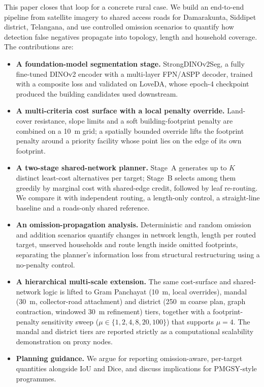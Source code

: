 \documentclass[journal]{IEEEtran}
\begin{document}
This paper closes that loop for a concrete rural case. We build an end-to-end pipeline from satellite imagery to shared access roads for Damarakunta, Siddipet district, Telangana, and use controlled omission scenarios to quantify how detection false negatives propagate into topology, length and household coverage. The contributions are:
\begin{itemize}
\item \textbf{A foundation-model segmentation stage.} StrongDINOv2Seg, a fully fine-tuned DINOv2 encoder with a multi-layer FPN/ASPP decoder, trained with a composite loss and validated on LoveDA, whose epoch-4 checkpoint produced the building candidates used downstream.
\item \textbf{A multi-criteria cost surface with a local penalty override.} Land-cover resistance, slope limits and a soft building-footprint penalty are combined on a 10~m grid; a spatially bounded override lifts the footprint penalty around a priority facility whose point lies on the edge of its own footprint.
\item \textbf{A two-stage shared-network planner.} Stage~A generates up to $K$ distinct least-cost alternatives per target; Stage~B selects among them greedily by marginal cost with shared-edge credit, followed by leaf re-routing. We compare it with independent routing, a length-only control, a straight-line baseline and a roads-only shared reference.
\item \textbf{An omission-propagation analysis.} Deterministic and random omission and addition scenarios quantify changes in network length, length per routed target, unserved households and route length inside omitted footprints, separating the planner's information loss from structural restructuring using a no-penalty control.
\item \textbf{A hierarchical multi-scale extension.} The same cost-surface and shared-network logic is lifted to Gram Panchayat (10~m, local overrides), mandal (30~m, collector-road attachment) and district (250~m coarse plan, graph contraction, windowed 30~m refinement) tiers, together with a footprint-penalty sensitivity sweep ($\mu\in\{1,2,4,8,20,100\}$) that supports $\mu=4$. The mandal and district tiers are reported strictly as a computational scalability demonstration on proxy nodes.
\item \textbf{Planning guidance.} We argue for reporting omission-aware, per-target quantities alongside IoU and Dice, and discuss implications for PMGSY-style programmes.
\end{itemize}
\end{document}
